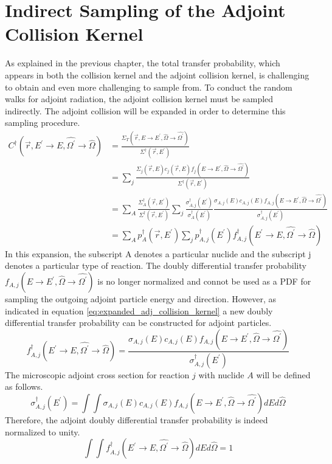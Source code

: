 \section{Indirect Sampling of the Adjoint Collision Kernel}
As explained in the previous chapter, the total transfer probability, which
appears in both the collision kernel and the adjoint collision kernel, is
challenging to obtain and even more challenging to sample from. To conduct
the random walks for adjoint radiation, the adjoint collision kernel 
must be sampled indirectly. The adjoint collision will be expanded in order
to determine this sampling procedure. 
\begin{align}
  C^{\dagger}(\vec{r},E^{'} \to E,\hat{\Omega^{'}} \to \hat{\Omega}) & =
  \frac{\Sigma_T(\vec{r},E \to E^{'},\hat{\Omega} \to \hat{\Omega^{'}})}
       {\Sigma^{\dagger}(\vec{r},E^{'})} \nonumber \\
       & = \sum_j 
       \frac{\Sigma_{j}(\vec{r},E)c_j(\vec{r},E)
         f_j(E \to E^{'},\hat{\Omega} \to \hat{\Omega^{'}})}
            {\Sigma^{\dagger}(\vec{r},E^{'})} \nonumber \\
  & = \sum_A \frac{\Sigma_A^{\dagger}(\vec{r},E^{'})}
                  {\Sigma^{\dagger}(\vec{r},E^{'})}
  \sum_j \frac{\sigma_{A,j}^{\dagger}(E^{'})}{\sigma_A^{\dagger}(E^{'})}
  \frac{\sigma_{A,j}(E) c_{A,j}(E) 
        f_{A,j}(E \to E^{'},\hat{\Omega} \to \hat{\Omega^{'}})}
       {\sigma_{A,j}^{\dagger}(E^{'})} \nonumber \\
  & = \sum_A p_A^{\dagger}(\vec{r},E^{'}) \sum_j p_{A,j}^{\dagger}(E^{'})
       f_{A,j}^{\dagger}(E^{'} \to E,\hat{\Omega^{'}} \to \hat{\Omega})
  \label{eq:expanded_adj_collision_kernel}
\end{align}
In this expansion, the subscript A denotes a particular nuclide and the
subscript j denotes a particular type of reaction. The doubly differential
transfer probability $f_{A,j}(E \to E^{'},\hat{\Omega} \to \hat{\Omega^{'}})$
is no longer normalized and connot be used as a PDF for sampling the outgoing
adjoint particle energy and direction. However, as indicated in equation
\ref{eq:expanded_adj_collision_kernel} a new doubly differential transfer
probability can be constructed for adjoint particles. 
\begin{equation}
  f_{A,j}^{\dagger}(E^{'} \to E,\hat{\Omega^{'}} \to \hat{\Omega}) = 
  \frac{\sigma_{A,j}(E)c_{A,j}(E) 
    f_{A,j}(E \to E^{'},\hat{\Omega} \to \hat{\Omega^{'}})}
       {\sigma_{A,j}^{\dagger}(E^{'})}
  \label{eq:adjoint_double_diff_transfer_prob}
\end{equation}
The microscopic adjoint cross section for reaction $j$ with nuclide $A$ will
be defined as follows.
\begin{equation}
  \sigma_{A,j}^{\dagger}(E^{'}) = \int\int
  \sigma_{A,j}(E)c_{A,j}(E) 
    f_{A,j}(E \to E^{'},\hat{\Omega} \to \hat{\Omega^{'}}) dE d\hat{\Omega}
  \label{eq:adjoint_cross_section}
\end{equation}
Therefore, the adjoint doubly differential transfer probability is indeed 
normalized to unity.
\begin{equation}
  \int\int f_{A,j}^{\dagger}(E^{'} \to E,\hat{\Omega^{'}} \to \hat{\Omega})
  dE d\hat{\Omega} = 1
\end{equation}

